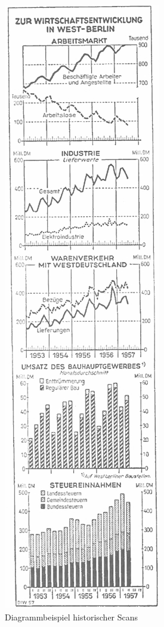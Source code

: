 \begin{figure}
    \vspace{-\intextsep} %
    \centering
    \includegraphics[width=\linewidth]{Methodik/img/scanbank_example.png}
    \caption{ Diagrammbeispiel historischer Scans}
    \label{fig:scanbank_example}
\end{figure}

